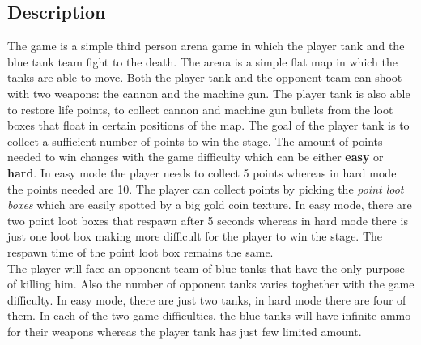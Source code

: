 \documentclass[14pt]{article}
\begin{document}
\subsection{Description}
The game is a simple third person arena game in which the player tank and the blue tank team fight to the death. The arena is a simple flat map in which the tanks are able to move. Both the player tank and the opponent team can shoot with two weapons: the cannon and the machine gun. The player tank is also able to restore life points, to collect cannon and machine gun bullets from the loot boxes that float in certain positions of the map. The goal of the player tank is to collect a sufficient number of points to win the stage. The amount of points needed to win changes with the game difficulty which can be either \textbf{easy} or \textbf{hard}. In easy mode the player needs to collect 5 points whereas in hard mode the points needed are 10. The player can collect points by picking the \textit{point loot boxes} which are easily spotted by a big gold coin texture. In easy mode, there are two point loot boxes that respawn after 5 seconds whereas in hard mode there is just one loot box making more difficult for the player to win the stage. The respawn time of the point loot box remains the same. \\
The player will face an opponent team of blue tanks that have the only purpose of killing him. Also the number of opponent tanks varies toghether with the game difficulty. In easy mode, there are just two tanks, in hard mode there are four of them. In each of the two game difficulties, the blue tanks will have infinite ammo for their weapons whereas the player tank has just few limited amount.
\end{document}
